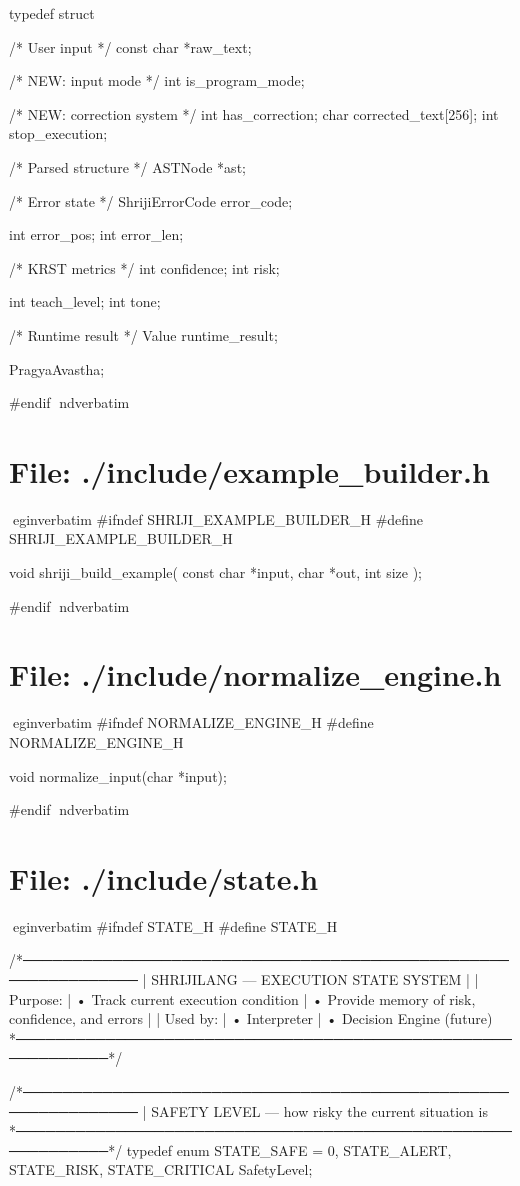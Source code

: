 \documentclass{article}
\begin{document}
typedef struct {

/* User input */
const char *raw_text;

/*  NEW: input mode */
int is_program_mode;

/* NEW: correction system */
int has_correction;
char corrected_text[256];
int stop_execution;

    /* Parsed structure */
    ASTNode *ast;

    /* Error state */
    ShrijiErrorCode error_code;

    int error_pos;
    int error_len;

    /* KRST metrics */
    int confidence;
    int risk;

    int teach_level;
    int tone;

    /* Runtime result */
    Value runtime_result;

} PragyaAvastha;

#endif
nd{verbatim}
\section*{File: ./include/example_builder.h}
egin{verbatim}
#ifndef SHRIJI_EXAMPLE_BUILDER_H
#define SHRIJI_EXAMPLE_BUILDER_H

void shriji_build_example(
    const char *input,
    char *out,
    int size
);

#endif
nd{verbatim}
\section*{File: ./include/normalize_engine.h}
egin{verbatim}
#ifndef NORMALIZE_ENGINE_H
#define NORMALIZE_ENGINE_H

void normalize_input(char *input);

#endif
nd{verbatim}
\section*{File: ./include/state.h}
egin{verbatim}
#ifndef STATE_H
#define STATE_H

/*──────────────────────────────────────────────────────────────
 |  SHRIJILANG — EXECUTION STATE SYSTEM
 |
 |  Purpose:
 |   • Track current execution condition
 |   • Provide memory of risk, confidence, and errors
 |
 |  Used by:
 |   • Interpreter
 |   • Decision Engine (future)
 *────────────────────────────────────────────────────────────*/

/*──────────────────────────────────────────────────────────────
 |  SAFETY LEVEL — how risky the current situation is
 *────────────────────────────────────────────────────────────*/
typedef enum {
    STATE_SAFE = 0,
    STATE_ALERT,
    STATE_RISK,
    STATE_CRITICAL
} SafetyLevel;
\end{document}
